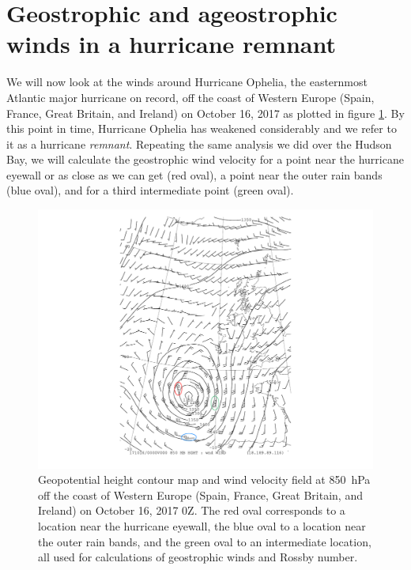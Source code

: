 \documentclass[11pt]{article}
\begin{document}
\section{Geostrophic and ageostrophic winds in a hurricane remnant}
We will now look at the winds around Hurricane Ophelia, the easternmost Atlantic major hurricane on record, off the coast of Western Europe (Spain, France, Great Britain, and Ireland) on October 16, 2017 as plotted in figure \ref{fig:ophelia}. By this point in time, Hurricane Ophelia has weakened considerably and we refer to it as a hurricane \emph{remnant}. Repeating the same analysis we did over the Hudson Bay, we will calculate the geostrophic wind velocity for a point near the hurricane eyewall or as close as we can get (red oval), a point near the outer rain bands (blue oval), and for a third intermediate point (green oval).

\begin{figure}[h!]
	\centering
	\includegraphics[trim={3.5cm 1cm 3.5cm 0},clip,width=\textwidth]{850hPa_hght_wind_ophelia}
	\caption{Geopotential height contour map and wind velocity field at \SI{850}{\hecto\Pa} off the coast of Western Europe (Spain, France, Great Britain, and Ireland) on October 16, 2017 0Z. The red oval corresponds to a location near the hurricane eyewall, the blue oval to a location near the outer rain bands, and the green oval to an intermediate location, all used for calculations of geostrophic winds and Rossby number.}
	\label{fig:ophelia}
\end{figure}
\end{document}
